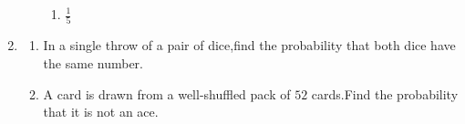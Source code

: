 \begin{enumerate}
\begin{enumerate}
\begin{enumerate}
        \item $\frac{1}{5}$               
\end{enumerate}
\end{enumerate}
\item \begin{enumerate}
\item In a single throw of a pair of dice,find the probability that both dice have the same number.
\item A card is drawn from a well-shuffled pack of $52$ cards.Find the probability that it is not an ace.
\end{enumerate}
\end{enumerate}
